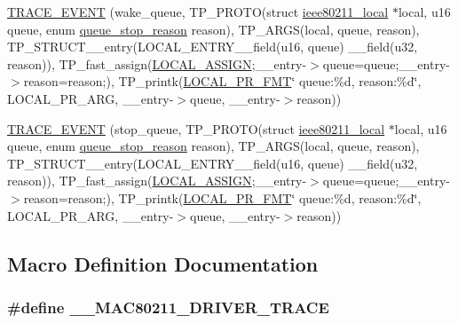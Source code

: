 \begin{DoxyCompactItemize}
\hyperlink{driver-trace_8h_ada71346e4ff7d3d56a8ea528309184c7}{T\-R\-A\-C\-E\-\_\-\-E\-V\-E\-N\-T} (wake\-\_\-queue, T\-P\-\_\-\-P\-R\-O\-T\-O(struct \hyperlink{structieee80211__local}{ieee80211\-\_\-local} $\ast$local, u16 queue, enum \hyperlink{ieee80211__i_8h_a4460446e58caf1e68958b737910a5c48}{queue\-\_\-stop\-\_\-reason} reason), T\-P\-\_\-\-A\-R\-G\-S(local, queue, reason), T\-P\-\_\-\-S\-T\-R\-U\-C\-T\-\_\-\-\_\-entry(L\-O\-C\-A\-L\-\_\-\-E\-N\-T\-R\-Y\-\_\-\-\_\-field(u16, queue) \-\_\-\-\_\-field(u32, reason)), T\-P\-\_\-fast\-\_\-assign(\hyperlink{driver-trace_8h_ab19d9141887ea92ef9640df06a51e0a1}{L\-O\-C\-A\-L\-\_\-\-A\-S\-S\-I\-G\-N};\-\_\-\-\_\-entry-\/$>$queue=queue;\-\_\-\-\_\-entry-\/$>$reason=reason;), T\-P\-\_\-printk(\hyperlink{driver-trace_8h_a09833af423135e21ffe99a59ae088cf1}{L\-O\-C\-A\-L\-\_\-\-P\-R\-\_\-\-F\-M\-T}\char`\"{} queue\-:\%d, reason\-:\%d\char`\"{}, L\-O\-C\-A\-L\-\_\-\-P\-R\-\_\-\-A\-R\-G, \-\_\-\-\_\-entry-\/$>$queue, \-\_\-\-\_\-entry-\/$>$reason))
\item 
\hyperlink{driver-trace_8h_ad1b961e7a105be9259f51d1c6ed2c549}{T\-R\-A\-C\-E\-\_\-\-E\-V\-E\-N\-T} (stop\-\_\-queue, T\-P\-\_\-\-P\-R\-O\-T\-O(struct \hyperlink{structieee80211__local}{ieee80211\-\_\-local} $\ast$local, u16 queue, enum \hyperlink{ieee80211__i_8h_a4460446e58caf1e68958b737910a5c48}{queue\-\_\-stop\-\_\-reason} reason), T\-P\-\_\-\-A\-R\-G\-S(local, queue, reason), T\-P\-\_\-\-S\-T\-R\-U\-C\-T\-\_\-\-\_\-entry(L\-O\-C\-A\-L\-\_\-\-E\-N\-T\-R\-Y\-\_\-\-\_\-field(u16, queue) \-\_\-\-\_\-field(u32, reason)), T\-P\-\_\-fast\-\_\-assign(\hyperlink{driver-trace_8h_ab19d9141887ea92ef9640df06a51e0a1}{L\-O\-C\-A\-L\-\_\-\-A\-S\-S\-I\-G\-N};\-\_\-\-\_\-entry-\/$>$queue=queue;\-\_\-\-\_\-entry-\/$>$reason=reason;), T\-P\-\_\-printk(\hyperlink{driver-trace_8h_a09833af423135e21ffe99a59ae088cf1}{L\-O\-C\-A\-L\-\_\-\-P\-R\-\_\-\-F\-M\-T}\char`\"{} queue\-:\%d, reason\-:\%d\char`\"{}, L\-O\-C\-A\-L\-\_\-\-P\-R\-\_\-\-A\-R\-G, \-\_\-\-\_\-entry-\/$>$queue, \-\_\-\-\_\-entry-\/$>$reason))
\end{DoxyCompactItemize}


\subsection{Macro Definition Documentation}
\hypertarget{driver-trace_8h_af0133dcc68c991c92720fdb90ee75d3b}{
\subsubsection[{\-\_\-\-\_\-\-M\-A\-C80211\-\_\-\-D\-R\-I\-V\-E\-R\-\_\-\-T\-R\-A\-C\-E}]{\setlength{\rightskip}{0pt plus 5cm}\#define \-\_\-\-\_\-\-M\-A\-C80211\-\_\-\-D\-R\-I\-V\-E\-R\-\_\-\-T\-R\-A\-C\-E}}\label{driver-trace_8h_af0133dcc68c991c92720fdb90ee75d3b}



